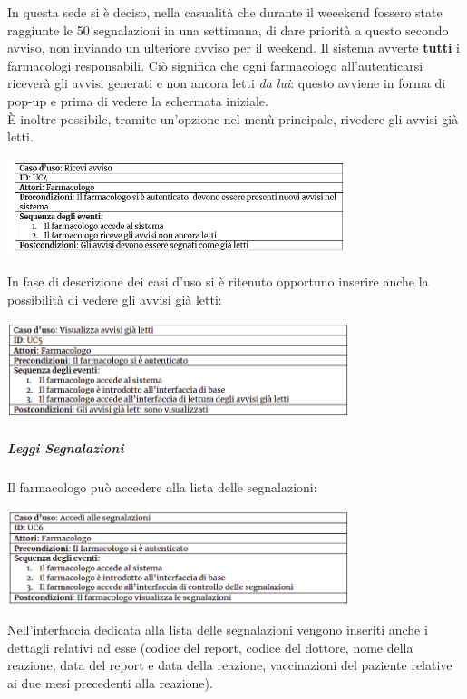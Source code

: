 \documentclass[11pt]{article}
\begin{document}
                In questa sede si è deciso, nella casualità che durante il weeekend fossero state raggiunte le 50 segnalazioni in una settimana, di dare priorità a questo secondo avviso, non inviando un ulteriore avviso per il weekend.
            \newpage
                Il sistema avverte \textbf{tutti} i farmacologi responsabili. Ciò significa che ogni farmacologo all'autenticarsi riceverà gli avvisi generati e non ancora letti \textit{da lui}:
                questo avviene in forma di pop-up e prima di vedere la schermata iniziale.\\
                È inoltre possibile, tramite un'opzione nel menù principale, rivedere gli avvisi già letti.
                    \begin{center}
                        \includegraphics[width=0.75\textwidth]{pictures/UC4.png}
                    \end{center}
                In fase di descrizione dei casi d'uso si è ritenuto opportuno inserire anche la possibilità di vedere gli avvisi già letti:
                    \begin{center}
                        \includegraphics[width=0.75\textwidth]{pictures/UC5.png}
                    \end{center}
            \subparagraph*{Leggi Segnalazioni}
                Il farmacologo può accedere alla lista delle segnalazioni:
                    \begin{center}
                        \includegraphics[width=0.75\textwidth]{pictures/UC6.png}
                    \end{center}
                Nell'interfaccia dedicata alla lista delle segnalazioni vengono inseriti anche i dettagli relativi ad esse (codice del report, codice del dottore, nome della reazione, data del report e data della reazione, vaccinazioni del paziente relative ai due mesi precedenti alla reazione).
\end{document}
